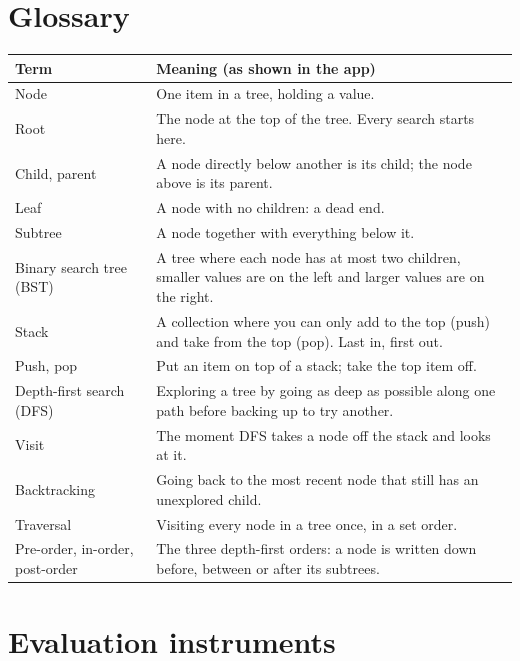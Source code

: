 \documentclass[11pt,a4paper]{article}
\begin{document}
\section{Glossary}
\label{app:glossary}

\begin{longtable}{@{}p{3.2cm} p{11.6cm}@{}}
  \toprule
  \textbf{Term} & \textbf{Meaning (as shown in the app)} \\
  \midrule
  \endhead
  Node & One item in a tree, holding a value. \\
  Root & The node at the top of the tree. Every search starts here. \\
  Child, parent & A node directly below another is its child; the node above is its parent. \\
  Leaf & A node with no children: a dead end. \\
  Subtree & A node together with everything below it. \\
  Binary search tree (BST) & A tree where each node has at most two children, smaller values are on
      the left and larger values are on the right. \\
  Stack & A collection where you can only add to the top (push) and take from the top (pop). Last
      in, first out. \\
  Push, pop & Put an item on top of a stack; take the top item off. \\
  Depth-first search (DFS) & Exploring a tree by going as deep as possible along one path before
      backing up to try another. \\
  Visit & The moment DFS takes a node off the stack and looks at it. \\
  Backtracking & Going back to the most recent node that still has an unexplored child. \\
  Traversal & Visiting every node in a tree once, in a set order. \\
  Pre-order, in-order, post-order & The three depth-first orders: a node is written down before,
      between or after its subtrees. \\
  \bottomrule
\end{longtable}

\section{Evaluation instruments}
\label{app:eval}
\end{document}
